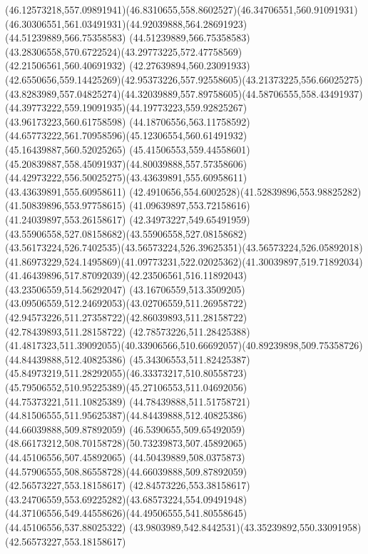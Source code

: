{{	\curveto(46.12573218,557.09891941)(46.8310655,558.8602527)(46.34706551,560.91091931)
	\curveto(46.30306551,561.03491931)(44.92039888,564.28691923)(44.51239889,566.75358583)
	\curveto(44.51239889,566.75358583)(43.28306558,570.6722524)(43.29773225,572.47758569)
	\lineto(42.21506561,560.40691932)
	\lineto(42.27639894,560.23091933)
	\curveto(42.6550656,559.14425269)(42.95373226,557.92558605)(43.21373225,556.66025275)
	\curveto(43.8283989,557.04825274)(44.32039889,557.89758605)(44.58706555,558.43491937)
	\curveto(44.39773222,559.19091935)(44.19773223,559.92825267)(43.96173223,560.61758598)
	\lineto(44.18706556,563.11758592)
	\curveto(44.65773222,561.70958596)(45.12306554,560.61491932)(45.16439887,560.52025265)
	\curveto(45.41506553,559.44558601)(45.20839887,558.45091937)(44.80039888,557.57358606)
	\curveto(44.42973222,556.50025275)(43.43639891,555.60958611)(43.43639891,555.60958611)
	\curveto(42.4910656,554.6002528)(41.52839896,553.98825282)(41.50839896,553.97758615)
	\lineto(41.09639897,553.72158616)
	\lineto(41.24039897,553.26158617)
	\curveto(42.34973227,549.65491959)(43.55906558,527.08158682)(43.55906558,527.08158682)
	\curveto(43.56173224,526.7402535)(43.56573224,526.39625351)(43.56573224,526.05892018)
	\curveto(41.86973229,524.1495869)(41.09773231,522.02025362)(41.30039897,519.71892034)
	\curveto(41.46439896,517.87092039)(42.23506561,516.11892043)(43.23506559,514.56292047)
	\curveto(43.16706559,513.3509205)(43.09506559,512.24692053)(43.02706559,511.26958722)
	\curveto(42.94573226,511.27358722)(42.86039893,511.28158722)(42.78439893,511.28158722)
	\lineto(42.78573226,511.28425388)
	\curveto(41.4817323,511.39092055)(40.33906566,510.66692057)(40.89239898,509.75358726)
	\moveto(44.84439888,512.40825386)
	\curveto(45.34306553,511.82425387)(45.84973219,511.28292055)(46.33373217,510.80558723)
	\curveto(45.79506552,510.95225389)(45.27106553,511.04692056)(44.75373221,511.10825389)
	\curveto(44.78439888,511.51758721)(44.81506555,511.95625387)(44.84439888,512.40825386)
	\moveto(44.66039888,509.87892059)
	\curveto(46.5390655,509.65492059)(48.66173212,508.70158728)(50.73239873,507.45892065)
	\lineto(44.45106556,507.45892065)
	\curveto(44.50439889,508.0375873)(44.57906555,508.86558728)(44.66039888,509.87892059)
	\moveto(42.56573227,553.18158617)
	\curveto(42.84573226,553.38158617)(43.24706559,553.69225282)(43.68573224,554.09491948)
	\curveto(44.37106556,549.44558626)(44.49506555,541.80558645)(44.45106556,537.88025322)
	\curveto(43.9803989,542.8442531)(43.35239892,550.33091958)(42.56573227,553.18158617)
}
}
